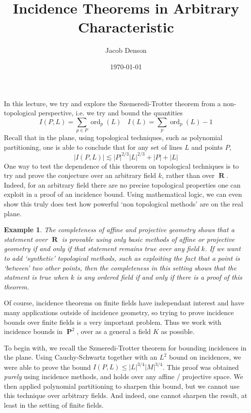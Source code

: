 \documentclass{article}
\title{Incidence Theorems in Arbitrary Characteristic}
\author{Jacob Denson}
\date{\today}
\theoremstyle{plain}
\newtheorem*{example}{Example}
\DeclareMathOperator{\RR}{\mathbf{R}}
\DeclareMathOperator{\PP}{\mathbf{P}}
\DeclareMathOperator{\ord}{\text{ord}}
\begin{document}
\maketitle

In this lecture, we try and explore the Szemeredi-Trotter theorem from a non-topological perspective, i.e. we try and bound the quantities
%
\[ I(P,L) = \sum_{p \in P} \ord_p(L)\ \ \ \ I(L) = \sum_p \ord_p(L) - 1 \]
%
Recall that in the plane, using topological techniques, such as polynomial partitioning, one is able to conclude that for any set of lines $L$ and points $P$,
%
\[ |I(P,L)| \lesssim |P|^{2/3} |L|^{2/3} + |P| + |L| \]
%
One way to test the dependence of this theorem on topological techniques is to try and prove the conjecture over an arbitrary field $k$, rather than over $\RR$. Indeed, for an arbitrary field there are no precise topological properties one can exploit in a proof of an incidence bound. Using mathematical logic, we can even show this truly does test how powerful `non topological methods' are on the real plane.

\begin{example}
    The {\it completeness} of affine and projective geometry shows that a statement over $\RR$ is provable using only basic methods of affine or projective geometry if and only if that statement remains true over any field $k$. If we want to add `synthetic' topological methods, such as exploiting the fact that a point is `between' two other points, then the completeness in this setting shows that the statment is true when $k$ is any {\it ordered} field if and only if there is a proof of this theorem.
\end{example}

Of course, incidence theorems on finite fields have independant interest and have many applications outside of incidence geometry, so trying to prove incidence bounds over finite fields is a very important problem. Thus we work with incidence bounds in $\PP^2$, over as a general a field $K$ as possible.

To begin with, we recall the Szmeredi-Trotter theorem for bounding incidences in the plane. Using Cauchy-Schwartz together with an $L^2$ bound on incidences, we were able to prove the bound $I(P,L) \leq |L|^{3/4} |M|^{3/4}$. This proof was obtained {\it purely} using incidence methods, and holds over any affine / projective space. We then applied polynomial partitioning to sharpen this bound, but we cannot use this technique over arbitrary fields. And indeed, one cannot sharpen the result, at least in the setting of finite fields.
\end{document}
